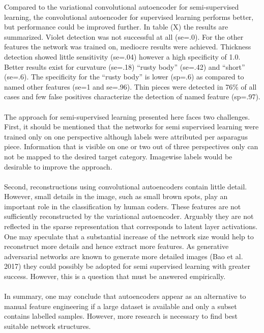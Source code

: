 Compared to the variational convolutional autoencoder for semi-supervised learning, the convolutional autoencoder for supervised learning performs better, but performance could be improved further. In table (X) the results are summarized. Violet detection was not successful at all (se=.0). For the other features the network was trained on, mediocre results were achieved. Thickness detection showed little sensitivity (se=.04) however a high specificity of 1.0. Better results exist for curvature (se=.18) “rusty body” (se=.42) and “short” (se=.6). The specificity for the “rusty body” is lower (sp=.6) as compared to named other features (se=1 and se=.96). Thin pieces were detected in 76\% of all cases and few false positives characterize the detection of named feature (sp=.97). \\
\\
The approach for semi-supervised learning presented here faces two challenges. First, it should be mentioned that the networks for semi supervised learning were trained only on one perspective although labels were attributed per asparagus piece. Information that is visible on one or two out of three perspectives only can not be mapped to the desired target category. Imagewise labels would be desirable to improve the approach. \\
\\
Second, reconstructions using convolutional autoencoders contain little detail. However, small details in the image, such as small brown spots, play an important role in the classification by human coders. These features are not sufficiently reconstructed by the variational autoencoder. Arguably they are not reflected in the sparse representation that corresponds to latent layer activations. One may speculate that a substantial increase of the network size would help to reconstruct more details and hence extract more features. As generative adversarial networks are known to generate more detailed images (Bao et al. 2017) they could possibly be adopted for semi supervised learning with greater success. However, this is a question that must be answered empirically. \\
\\
In summary, one may conclude that autoencoders appear as an alternative to manual feature engineering if a large dataset is available and only a subset contains labelled samples. However, more research is necessary to find best suitable network structures.\\
\\
